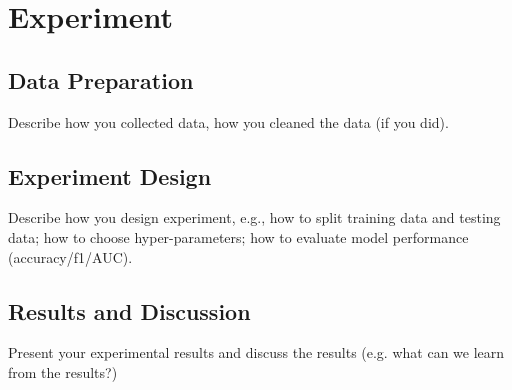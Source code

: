 \documentclass{article}
\begin{document}
\section{Experiment}

\subsection{Data Preparation}

Describe how you collected data, how
you cleaned the data (if you did).

\subsection{Experiment Design}

Describe how you design experiment,
e.g., how to split training data and testing
data; how to choose hyper-parameters; how
to evaluate model performance (accuracy/f1/AUC).

\subsection{Results and Discussion}

Present your experimental results and discuss
the results (e.g. what can we learn from the
results?)


\end{document}
